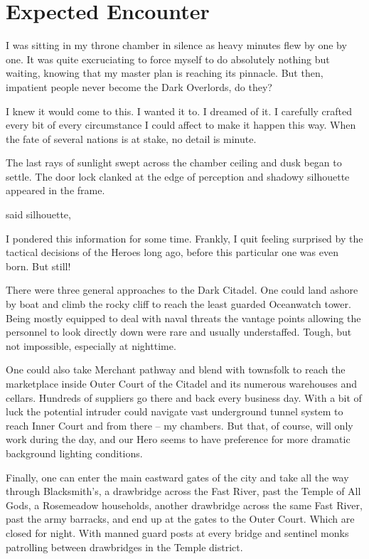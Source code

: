 \section{Expected Encounter}

I was sitting in my throne chamber in silence as heavy minutes flew by one by one. It was quite excruciating to force myself to do absolutely nothing but waiting, knowing that my master plan is reaching its pinnacle. But then, impatient people never become the Dark Overlords, do they?

I knew it would come to this. I wanted it to. I dreamed of it. I carefully crafted every bit of every circumstance I could affect to make it happen this way. When the fate of several nations is at stake, no detail is minute.

The last rays of sunlight swept across the chamber ceiling and dusk began to settle. The door lock clanked at the edge of perception and shadowy silhouette appeared in the frame.

 said silhouette, 

I pondered this information for some time. Frankly, I quit feeling surprised by the tactical decisions of the Heroes long ago, before this particular one was even born. But still!

There were three general approaches to the Dark Citadel. One could land ashore by boat and climb the rocky cliff to reach the least guarded Oceanwatch tower. Being mostly equipped to deal with naval threats the vantage points allowing the personnel to look directly down were rare and usually understaffed. Tough, but not impossible, especially at nighttime.

One could also take Merchant pathway and blend with townsfolk to reach the marketplace inside Outer Court of the Citadel and its numerous warehouses and cellars. Hundreds of suppliers go there and back every business day. With a bit of luck the potential intruder could navigate vast underground tunnel system to reach Inner Court and from there -- my chambers. But that, of course, will only work during the day, and our Hero seems to have preference for more dramatic background lighting conditions.

Finally, one can enter the main eastward gates of the city and take all the way through Blacksmith’s, a drawbridge across the Fast River, past the Temple of All Gods, a Rosemeadow households, another drawbridge across the same Fast River, past the army barracks, and end up at the gates to the Outer Court. Which are closed for night. With manned guard posts at every bridge and sentinel monks patrolling between drawbridges in the Temple district.

